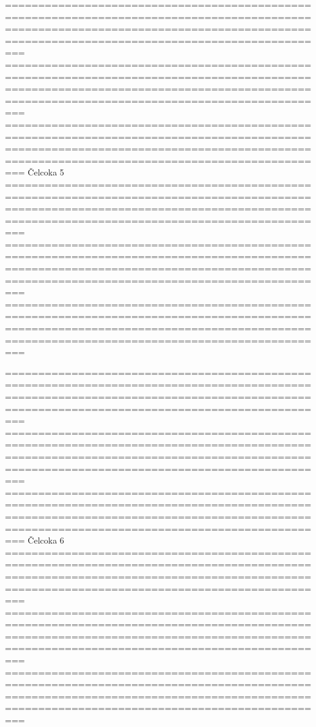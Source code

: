 ===========================================================================================================================================================================================
===========================================================================================================================================================================================
===========================================================================================================================================================================================
Čelcoka 5
===========================================================================================================================================================================================
===========================================================================================================================================================================================
===========================================================================================================================================================================================

===========================================================================================================================================================================================
===========================================================================================================================================================================================
===========================================================================================================================================================================================
Čelcoka 6
===========================================================================================================================================================================================
===========================================================================================================================================================================================
===========================================================================================================================================================================================

